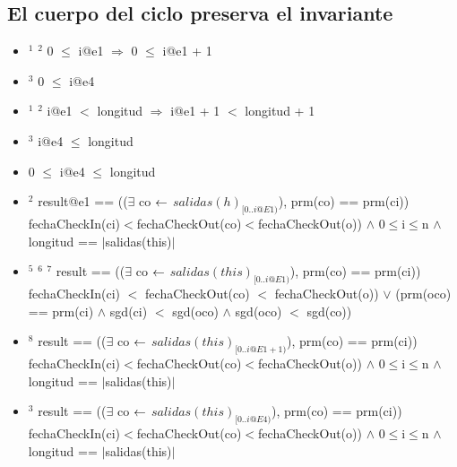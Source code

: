 \subsection{El cuerpo del ciclo preserva el invariante}
\begin{itemize}
	\item $ ^1 $ $ ^2 $ 0 $ \leq $ i@e1 $ \Rightarrow $ 0 $ \leq $ i@e1 + 1
	\item $ ^3 $ 0 $ \leq $ i@e4
	\item $ ^1 $ $^2 $ i@e1 $ < $ longitud $ \Rightarrow $ i@e1 + 1 $ < $ longitud + 1
	\item $ ^3 $ i@e4 $ \leq $ longitud	
	\item \textcolor{NavyBlue}{0 $ \leq $ i@e4 $ \leq $ longitud} \checkmark	
	\item $ ^2 $ result@e1 == (($ \exists $ co $ \leftarrow $ $salidas(h)_{[0..i@E1)}$), prm(co) == prm(ci)) fechaCheckIn(ci)$ < $fechaCheckOut(co)$ < $fechaCheckOut(o)) $ \land $ 0$\leq$i$\leq$n $ \land $ longitud == $|$salidas(this)$|$
	\item $ ^5 $ $ ^6 $ $ ^7 $ result == (($ \exists $ co $ \leftarrow $ $salidas(this)_{[0..i@E1)}$), prm(co) == prm(ci))\\
fechaCheckIn(ci) $<$ fechaCheckOut(co) $<$ fechaCheckOut(o)) $ \lor $ (prm(oco) == prm(ci) $ \land $ sgd(ci) $<$ sgd(oco) $ \land $ sgd(oco) $<$ sgd(co))\\
	\item $ ^8 $ result == (($ \exists $ co $ \leftarrow $ $salidas(this)_{[0..i@E1 + 1)}$), prm(co) == prm(ci)) fechaCheckIn(ci)$ < $fechaCheckOut(co)$ < $fechaCheckOut(o)) $ \land $ 0$\leq$i$\leq$n $ \land $ longitud == $|$salidas(this)$|$
	\item $ ^3 $\textcolor{NavyBlue}{ result == (($ \exists $ co $ \leftarrow $ $salidas(this)_{[0..i@E4)}$), prm(co) == prm(ci)) fechaCheckIn(ci)$ < $fechaCheckOut(co)$ < $fechaCheckOut(o)) $ \land $ 0$\leq$i$\leq$n $ \land $ longitud == $|$salidas(this)$|$} \checkmark
\end{itemize}
\vspace{3mm}

